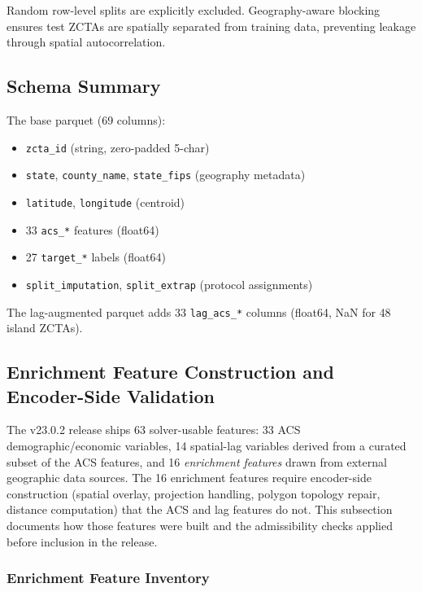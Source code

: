 \documentclass{article}
\begin{document}
Random row-level splits are explicitly excluded. Geography-aware blocking ensures test ZCTAs are spatially separated from training data, preventing leakage through spatial autocorrelation.

\subsection{Schema Summary}

The base parquet (69 columns):
\begin{itemize}
\item \texttt{zcta\_id} (string, zero-padded 5-char)
\item \texttt{state}, \texttt{county\_name}, \texttt{state\_fips} (geography metadata)
\item \texttt{latitude}, \texttt{longitude} (centroid)
\item 33 \texttt{acs\_*} features (float64)
\item 27 \texttt{target\_*} labels (float64)
\item \texttt{split\_imputation}, \texttt{split\_extrap} (protocol assignments)
\end{itemize}

The lag-augmented parquet adds 33 \texttt{lag\_acs\_*} columns (float64, NaN for 48 island ZCTAs).

\subsection{Enrichment Feature Construction and Encoder-Side Validation}
\label{app:methodology}

The v23.0.2 release ships 63 solver-usable features: 33 ACS demographic/economic variables, 14 spatial-lag variables derived from a curated subset of the ACS features, and 16 \emph{enrichment features} drawn from external geographic data sources. The 16 enrichment features require encoder-side construction (spatial overlay, projection handling, polygon topology repair, distance computation) that the ACS and lag features do not. This subsection documents how those features were built and the admissibility checks applied before inclusion in the release.

\subsubsection{Enrichment Feature Inventory}
\end{document}
